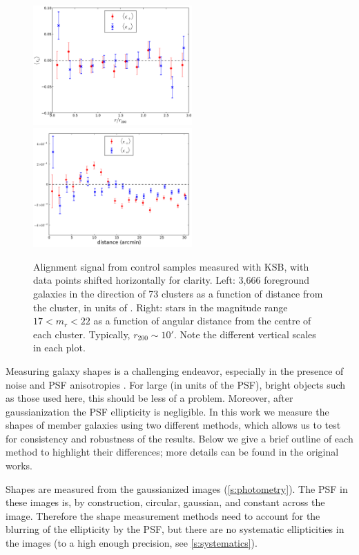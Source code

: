 \begin{figure}
 \centerline{\includegraphics[width=2.4in]{chapter4/shear-foreground-rnorm.pdf}
             \includegraphics[width=2.4in]{chapter4/shear-stars-profile.pdf}}
\caption{\small Alignment signal from control samples measured with KSB, with data points shifted 
horizontally for clarity. Left: 3,666 foreground galaxies in the direction of 73 clusters as a 
function of distance from the cluster, in units of \radius. Right: stars in the magnitude range 
$17<m_r<22$ as a function of angular distance from the centre of each cluster. Typically, 
$r_{200}\sim10'$. Note the different vertical scales in each plot.}
\label{f:control}
\end{figure}

Measuring galaxy shapes is a challenging endeavor, especially in the presence of noise and PSF 
anisotropies \citep[e.g.,][]{massey07,melchior12,kitching13}. For large (in units of the PSF), 
bright objects such as those used here, this should be less of a problem. Moreover, after 
gaussianization the PSF ellipticity is negligible. In this work we measure the shapes of member 
galaxies using two different methods, which allows us to test for consistency and robustness of the 
results. Below we give a brief outline of each method to highlight their differences; more details 
can be found in the original works.

Shapes are measured from the gaussianized images (\cref{s:photometry}). The PSF in these images is, 
by construction, circular, gaussian, and constant across the image. Therefore the shape measurement 
methods need to account for the blurring of the ellipticity by the PSF, but there are no systematic 
ellipticities in the images (to a high enough precision, see \cref{s:systematics}).

